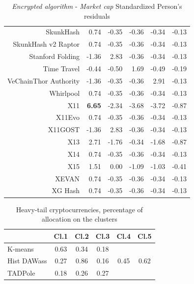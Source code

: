 \documentclass{bmcart}
\begin{document}
\begin{backmatter}
\begin{table}[ht]
\begin{tabular}{rrrrrr}
		SkunkHash & 0.74 & -0.35 & -0.36 & -0.34 & -0.13 \\ 
		SkunkHash v2 Raptor & 0.74 & -0.35 & -0.36 & -0.34 & -0.13 \\ 
		Stanford Folding & -1.36 & 2.83 & -0.36 & -0.34 & -0.13 \\ 
		Time Travel & -0.44 & -0.50 & 1.69 & -0.49 & -0.19 \\ 
		VeChainThor Authority & -1.36 & -0.35 & -0.36 & 2.91 & -0.13 \\ 
		Whirlpool & 0.74 & -0.35 & -0.36 & -0.34 & -0.13 \\ 
		X11 & \textbf{6.65} & -2.34 & -3.68 & -3.72 & -0.87 \\ 
		X11Evo & 0.74 & -0.35 & -0.36 & -0.34 & -0.13 \\ 
		X11GOST & -1.36 & 2.83 & -0.36 & -0.34 & -0.13 \\ 
		X13 & 2.71 & -1.76 & -0.34 & -1.68 & -0.87 \\ 
		X14 & 0.74 & -0.35 & -0.36 & -0.34 & -0.13 \\ 
		X15 & 1.51 & 0.00 & -1.09 & -1.03 & -0.41 \\ 
		XEVAN & 0.74 & -0.35 & -0.36 & -0.34 & -0.13 \\ 
		XG Hash & 0.74 & -0.35 & -0.36 & -0.34 & -0.13 \\ 
		\hline
	\end{tabular}
	\caption{\textit{Encrypted algorithm} - \textit{Market cap} Standardized Person's residuals}
	\label{tab:AlgorithmPercMkCaP}
\end{table}

\begin{table}[]
	\centering
		\begin{tabular}{lccccc}
			\hline
			& Cl.1 & Cl.2 & Cl.3 & Cl.4 & Cl.5 \\
			\hline
			K-means     & 0.63   & 0.34  & 0.18  &      &      \\
			Hist DAWass & 0.27  & 0.86  & 0.16  & 0.45   & 0.62   \\
			TADPole     & 0.18    & 0.26  & 0.27  &      &  \\
			\hline    
		\end{tabular}%
		\caption{Heavy-tail cryptocurrencies, percentage of allocation on the clusters}
		\label{tab:HeavyTail}
\end{table}




\end{backmatter}
\end{document}
